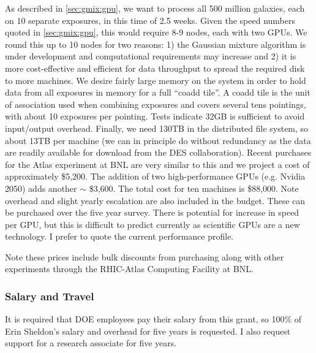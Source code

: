 \documentclass[12pt]{article}
\begin{document}

As described in \ref{sec:gmix:gpu}, we want to process all 500 million
galaxies, each on 10 separate exposures, in this time of 2.5 weeks. Given the
speed numbers quoted in \ref{sec:gmix:gpu}, this would require 8-9 nodes, each
with two GPUs.  We round this up to 10 nodes for two reasons: 1) the Gaussian
mixture algorithm is under development and computational requirements may
increase and 2) it is more cost-effective and efficient for data throughput to
spread the required disk to more machines.  We desire fairly large memory on
the system in order to hold data from all exposures in memory for a full
``coadd tile''. A coadd tile is the unit of association used when combining
exposures and covers several tens pointings, with about 10 exposures per
pointing.  Tests indicate 32GB is sufficient to avoid input/output overhead.
Finally, we need 130TB in the distributed file system, so about 13TB per
machine (we can in principle do without redundancy as the data are readily
available for download from the DES collaboration).  Recent purchases for the
Atlas experiment at BNL are very similar to this and we project a cost of
approximately \$5,200.  The addition of two high-performance GPUs (e.g. Nvidia
2050) adds another $\sim$ \$3,600.  The total cost for ten machines is
\$88,000.  Note overhead and slight yearly escalation are also included in the
budget.  These can be purchased over the five year survey.  There is potential
for increase in speed per GPU, but this is difficult to predict currently as
scientific GPUs are a new technology.  I prefer to quote the current
performance profile.

Note these prices include bulk discounts from purchasing along with other
experiments through the RHIC-Atlas Computing Facility at BNL.  



\subsubsection{Salary and Travel}

It is required that DOE employees pay their salary from this grant, so 100\% of
Erin Sheldon's salary and overhead for five years is requested.  I also request
support for a research associate for five years.
\end{document}
